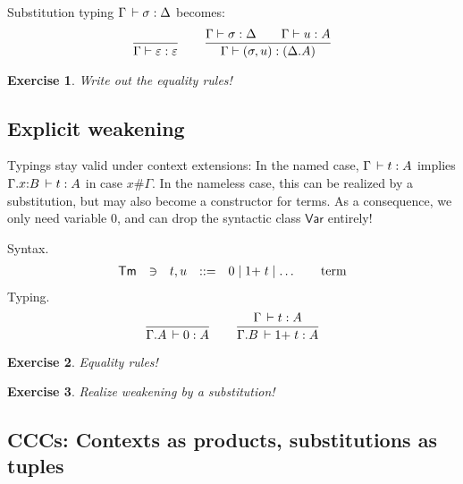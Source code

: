 \documentclass[a4paper,fleqn]{scrartcl}
\newtheorem{exercise}{Exercise}
\newcommand{\Var}{\mathsf{Var}}
\newcommand{\Tm}{\mathsf{Tm}}
\begin{document}
Substitution typing $\Gamma \,\vdash \sigma : \Delta$ becomes:
\[
  \dfrac{}{\Gamma \vdash \varepsilon : \varepsilon}
\qquad
  \dfrac{\Gamma \vdash \sigma : \Delta \qquad \Gamma \vdash u : A
     }{\Gamma \vdash (\sigma,u) : (\Delta.A)
     }
\]
\begin{exercise}
Write out the equality rules!
\end{exercise}


\subsection{Explicit weakening}

Typings stay valid under context extensions: In the named case, $\Gamma \,\vdash t : A$ implies $\Gamma.x{:}B \,\vdash t : A$ in case $x \# \Gamma$.  In the nameless case, this can be realized by a substitution, but may also become a constructor for terms.  As a consequence, we only need variable $0$, and can drop the syntactic class $\Var$ entirely!

Syntax.
\[
\begin{array}{lllrl@{\qquad}l}
\Tm & \ni & t,u & ::= & 0 \mid {1+}\;t \mid \dots & \mbox{term} \\
\end{array}
\]
Typing.
\[
  \dfrac{}{\Gamma.A \,\vdash 0 : A}
\qquad
  \dfrac{\Gamma \,\vdash t : A}{\Gamma.B \,\vdash {1+}\; t : A}
\]
\begin{exercise}
Equality rules!
\end{exercise}
\begin{exercise}
Realize weakening by a substitution!
\end{exercise}


\subsection{CCCs: Contexts as products, substitutions as tuples}
\end{document}
